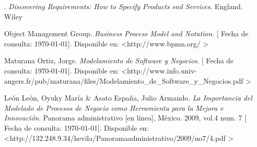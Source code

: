 \documentclass[spanish,12pt,letterpapper]{article}
\begin{document}
	\pagebreak
	\begin{thebibliography}{9}
	 . 
		\emph{Discovering Requirements: How to Specify Products snd Services}. England. Wiley
	
	 Object Management Group. 
		\emph{Business Process Model and Notation}. {[} Fecha de consulta: \today {]}. Disponible en: \textless http://www.bpmn.org/ \textgreater	
	
		 Maturana Ortiz, Jorge. 
		\emph{Modelamiento de Software y Negocios}. {[} Fecha de consulta: \today {]}. Disponible en: \textless http://www.info.univ-angers.fr/pub/maturana/files/Modelamiento\_de\_Software\_y\_Negocios.pdf \textgreater
		
		 León León, Oyuky María \& Asato España, Julio Armando. 
		\emph{La Importancia del Modelado de Procesos de
			Negocio como Herramienta para la Mejora e
			Innovación}. Panorama administrativo {[}en linea{]}, México. 2009, vol.4 num. 7  {[} Fecha de consulta: \today {]}. Disponible en: \textless http://132.248.9.34/hevila/Panoramaadministrativo/2009/no7/4.pdf \textgreater
	\end{thebibliography}
\end{document}
